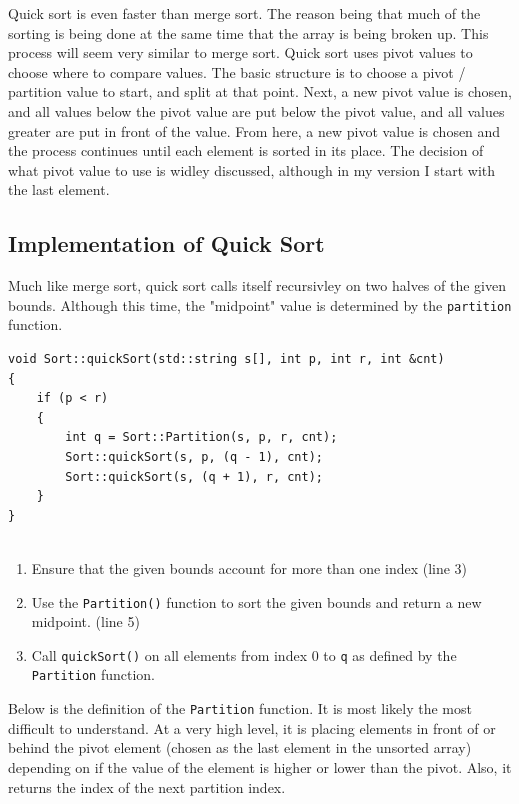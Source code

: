 \documentclass[letterpaper, 10pt]{article}
\begin{document}
Quick sort is even faster than merge sort. The reason being that much of the sorting is being done at the same time that the array is being broken up. This process will seem very similar to merge sort. Quick sort uses pivot values to choose where to compare values. The basic structure is to choose a pivot / partition value to start, and split at that point. Next, a new pivot value is chosen, and all values below the pivot value are put below the pivot value, and all values greater are put in front of the value. From here, a new pivot value is chosen and the process continues until each element is sorted in its place. The decision of what pivot value to use is widley discussed, although in my version I start with the last element.


\subsection{Implementation of Quick Sort}

Much like merge sort, quick sort calls itself recursivley on two halves of the given bounds. Although this time, the "midpoint" value is determined by the \texttt{partition} function.

 \begin{addmargin}[-5em]{1em}
\begin{small}
\begin{verbatim}
void Sort::quickSort(std::string s[], int p, int r, int &cnt)
{
	if (p < r)
	{
		int q = Sort::Partition(s, p, r, cnt);
		Sort::quickSort(s, p, (q - 1), cnt);
		Sort::quickSort(s, (q + 1), r, cnt);
	}
}


\end{verbatim}
\end{small}
\end{addmargin}

\begin{enumerate}
    \item Ensure that the given bounds account for more than one index (line 3)
    \item Use the \texttt{Partition()} function to sort the given bounds and return a new midpoint. (line 5)
    \item Call \texttt{quickSort()} on all elements from index 0 to \texttt{q} as defined by the \texttt{Partition} function.
\end{enumerate}

Below is the definition of the \texttt{Partition} function. It is most likely the most difficult to understand. At a very high level, it is placing elements in front of or behind the pivot element (chosen as the last element in the unsorted array) depending on if the value of the element is higher or lower than the pivot. Also, it returns the index of the next partition index.
\end{document}
